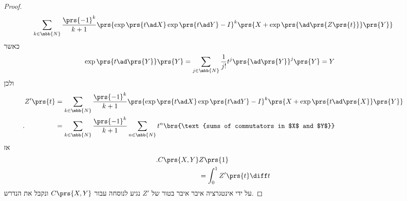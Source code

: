 \documentclass[10pt, twoside]{book}
\begin{document}
\begin{proof}
\begin{align*}
\sum_{k \in \mbb{N}} \frac{\prs{-1}^k}{k+1} \prs{\exp\prs{t \ad X} \exp\prs{t \ad Y} - I}^k \prs{X + \exp\prs{\ad \prs{Z\prs{t}}} \prs{Y}}
\end{align*}
כאשר
\begin{align*}
\exp\prs{t \ad \prs{Y}} \prs{Y} &= \sum_{j \in \mbb{N}} \frac{1}{j!} t^j \prs{\ad \prs{Y}}^j \prs{Y} = Y
\end{align*}
ולכן
\begin{align*}
Z'\prs{t} &= \sum_{k \in \mbb{N}} \frac{\prs{-1}^k}{k+1} \prs{\exp\prs{t \ad X} \exp\prs{t \ad Y} - I}^k \prs{X + \exp\prs{t \ad\prs{X}} \prs{Y}}
\\\text{.} \hphantom{Z'\prs{t}} &=
\sum_{k \in \mbb{N}} \frac{\prs{-1}^k}{k+1} \sum_{n \in \mbb{N}} t^n \brs{\text{sums of commutators in $X$ and $Y$}}
\end{align*}
אז
\begin{align*}
\text{.} C\prs{X,Y} & Z\prs{1}
\\&=
\int_0^1 Z'\prs{t} \diff t
\end{align*}
על ידי אינטגרציה איבר איבר בטור של
$Z'$
נגיע לנוסחה עבור
$C\prs{X,Y}$
ונקבל את הנדרש.
\end{proof}
\end{document}
